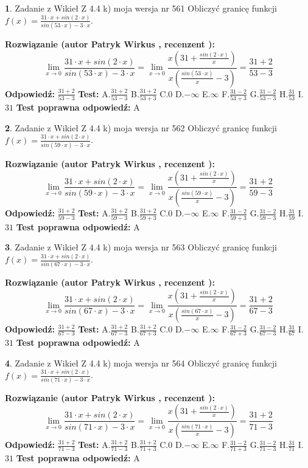 \documentclass[12pt, a4paper]{article}
\theoremstyle{definition} %
\newtheorem{zad}{}
\newcommand{\zadStart}[1]{\begin{zad}#1\newline}
\newcommand{\zadStop}{\end{zad}}
\newcommand{\rozwStart}[2]{\noindent \textbf{Rozwiązanie (autor #1 , recenzent #2): }\newline}
\newcommand{\rozwStop}{\newline}
\newcommand{\odpStart}{\noindent \textbf{Odpowiedź:}\newline}
\newcommand{\odpStop}{\newline}
\newcommand{\testStart}{\noindent \textbf{Test:}\newline}
\newcommand{\testStop}{\newline}
\newcommand{\kluczStart}{\noindent \textbf{Test poprawna odpowiedź:}\newline}
\newcommand{\kluczStop}{\newline}
\begin{document}
\zadStart{Zadanie z Wikieł Z 4.4 k) moja wersja nr 561}
Obliczyć granicę funkcji $f(x)=\frac{31\cdot x +sin(2\cdot x)}{sin(53\cdot x) -3\cdot x}$.
\zadStop
\rozwStart{Patryk Wirkus}{}
$$\lim\limits_{x\to 0}\frac{31\cdot x +sin(2\cdot x)}{sin(53\cdot x) -3\cdot x}
=\lim\limits_{x\to 0}\frac{x(31+\frac{sin(2\cdot x)}{x})}{x(\frac{sin(53\cdot x)}{x}-3)}
=\frac{31+2}{53-3}$$
\rozwStop
\odpStart
$\frac{31+2}{53-3}$
\odpStop
\testStart
A.$\frac{31+2}{53-3}$
B.$\frac{31+2}{53+3}$
C.$0$
D.$-\infty$
E.$\infty$
F.$\frac{31-2}{53+3}$
G.$\frac{31-2}{53-3}$
H.$\frac{31}{53}$
I.$31$
\testStop
\kluczStart
A
\kluczStop



\zadStart{Zadanie z Wikieł Z 4.4 k) moja wersja nr 562}
Obliczyć granicę funkcji $f(x)=\frac{31\cdot x +sin(2\cdot x)}{sin(59\cdot x) -3\cdot x}$.
\zadStop
\rozwStart{Patryk Wirkus}{}
$$\lim\limits_{x\to 0}\frac{31\cdot x +sin(2\cdot x)}{sin(59\cdot x) -3\cdot x}
=\lim\limits_{x\to 0}\frac{x(31+\frac{sin(2\cdot x)}{x})}{x(\frac{sin(59\cdot x)}{x}-3)}
=\frac{31+2}{59-3}$$
\rozwStop
\odpStart
$\frac{31+2}{59-3}$
\odpStop
\testStart
A.$\frac{31+2}{59-3}$
B.$\frac{31+2}{59+3}$
C.$0$
D.$-\infty$
E.$\infty$
F.$\frac{31-2}{59+3}$
G.$\frac{31-2}{59-3}$
H.$\frac{31}{59}$
I.$31$
\testStop
\kluczStart
A
\kluczStop



\zadStart{Zadanie z Wikieł Z 4.4 k) moja wersja nr 563}
Obliczyć granicę funkcji $f(x)=\frac{31\cdot x +sin(2\cdot x)}{sin(67\cdot x) -3\cdot x}$.
\zadStop
\rozwStart{Patryk Wirkus}{}
$$\lim\limits_{x\to 0}\frac{31\cdot x +sin(2\cdot x)}{sin(67\cdot x) -3\cdot x}
=\lim\limits_{x\to 0}\frac{x(31+\frac{sin(2\cdot x)}{x})}{x(\frac{sin(67\cdot x)}{x}-3)}
=\frac{31+2}{67-3}$$
\rozwStop
\odpStart
$\frac{31+2}{67-3}$
\odpStop
\testStart
A.$\frac{31+2}{67-3}$
B.$\frac{31+2}{67+3}$
C.$0$
D.$-\infty$
E.$\infty$
F.$\frac{31-2}{67+3}$
G.$\frac{31-2}{67-3}$
H.$\frac{31}{67}$
I.$31$
\testStop
\kluczStart
A
\kluczStop



\zadStart{Zadanie z Wikieł Z 4.4 k) moja wersja nr 564}
Obliczyć granicę funkcji $f(x)=\frac{31\cdot x +sin(2\cdot x)}{sin(71\cdot x) -3\cdot x}$.
\zadStop
\rozwStart{Patryk Wirkus}{}
$$\lim\limits_{x\to 0}\frac{31\cdot x +sin(2\cdot x)}{sin(71\cdot x) -3\cdot x}
=\lim\limits_{x\to 0}\frac{x(31+\frac{sin(2\cdot x)}{x})}{x(\frac{sin(71\cdot x)}{x}-3)}
=\frac{31+2}{71-3}$$
\rozwStop
\odpStart
$\frac{31+2}{71-3}$
\odpStop
\testStart
A.$\frac{31+2}{71-3}$
B.$\frac{31+2}{71+3}$
C.$0$
D.$-\infty$
E.$\infty$
F.$\frac{31-2}{71+3}$
G.$\frac{31-2}{71-3}$
H.$\frac{31}{71}$
I.$31$
\testStop
\kluczStart
A
\kluczStop
\end{document}
